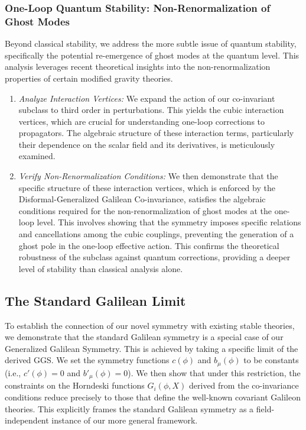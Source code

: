 \documentclass[twocolumn]{aastex631}
\begin{document}
\subsubsection{One-Loop Quantum Stability: Non-Renormalization of Ghost Modes}
Beyond classical stability, we address the more subtle issue of quantum stability, specifically the potential re-emergence of ghost modes at the quantum level. This analysis leverages recent theoretical insights into the non-renormalization properties of certain modified gravity theories.
\begin{enumerate}
    \item \textit{Analyze Interaction Vertices:} We expand the action of our co-invariant subclass to third order in perturbations. This yields the cubic interaction vertices, which are crucial for understanding one-loop corrections to propagators. The algebraic structure of these interaction terms, particularly their dependence on the scalar field and its derivatives, is meticulously examined.
    \item \textit{Verify Non-Renormalization Conditions:} We then demonstrate that the specific structure of these interaction vertices, which is enforced by the Disformal-Generalized Galilean Co-invariance, satisfies the algebraic conditions required for the non-renormalization of ghost modes at the one-loop level. This involves showing that the symmetry imposes specific relations and cancellations among the cubic couplings, preventing the generation of a ghost pole in the one-loop effective action. This confirms the theoretical robustness of the subclass against quantum corrections, providing a deeper level of stability than classical analysis alone.
\end{enumerate}

\subsection{The Standard Galilean Limit}
To establish the connection of our novel symmetry with existing stable theories, we demonstrate that the standard Galilean symmetry is a special case of our Generalized Galilean Symmetry. This is achieved by taking a specific limit of the derived GGS. We set the symmetry functions $c(\phi)$ and $b_\mu(\phi)$ to be constants (i.e., $c'(\phi)=0$ and $b'_\mu(\phi)=0$). We then show that under this restriction, the constraints on the Horndeski functions $G_i(\phi, X)$ derived from the co-invariance conditions reduce precisely to those that define the well-known covariant Galileon theories. This explicitly frames the standard Galilean symmetry as a field-independent instance of our more general framework.
\end{document}
